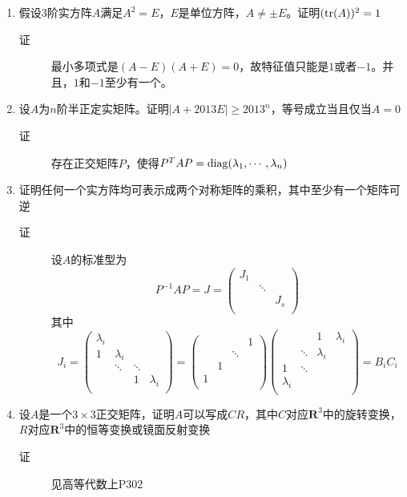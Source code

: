 \begin{enumerate}
\item 假设3阶实方阵$A$满足$A^2 = E$，$E$是单位方阵，$A\neq \pm E$。证明$(\operatorname{tr}(A))^2 = 1$
\begin{description}
\item[证] 最小多项式是$(A-E)(A+E)=0$，故特征值只能是$1$或者$-1$。并且，$1$和$-1$至少有一个。
\end{description}

\item 设$A$为$n$阶半正定实矩阵。证明$|A+2013E|\geq2013^n$，等号成立当且仅当$A=0$
\begin{description}
\item[证] 存在正交矩阵$P$，使得$P^TAP=\operatorname{diag}(\lambda_1,\cdots,\lambda_n)$
\end{description}

\item 证明任何一个实方阵均可表示成两个对称矩阵的乘积，其中至少有一个矩阵可逆
\begin{description}
\item[证] 设$A$的标准型为
\[
P^{-1}AP = J = \left(
\begin{array}{ccc}
J_1 & & \\
 & \ddots & \\
 & & J_s \\
\end{array}\right)
\]
其中
\[
J_i = \left(
\begin{array}{cccc}
\lambda_i & & & \\
1 & \lambda_i & & \\
 & \ddots & \ddots & \\
 & & 1 & \lambda_i \\
\end{array} \right) = \left(
\begin{array}{cccc}
 & & & 1\\
 & & \ddots & \\
 & 1 & & \\
1 & & & \\
\end{array}\right)\left(
\begin{array}{cccc}
 & & 1 & \lambda_i\\
 & \ddots & \lambda_i & \\
1 & \ddots & & \\
\lambda_i & & & \\
\end{array}\right) =B_iC_i
\]
\end{description}

\item 设$A$是一个$3\times 3$正交矩阵，证明$A$可以写成$CR$，其中$C$对应$\mathbf{R}^3$中的旋转变换，$R$对应$\mathbf{R}^3$中的恒等变换或镜面反射变换
\begin{description}
\item[证] 见高等代数上P302
\end{description}



\end{enumerate}
